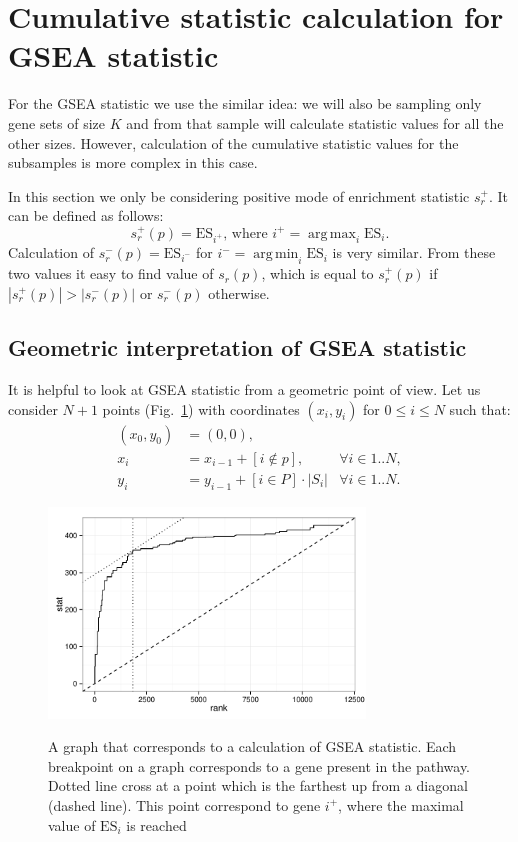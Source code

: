\documentclass[runningheads,a4paper]{llncs}
\DeclareMathOperator*{\argmax}{arg\,max}
\DeclareMathOperator*{\argmin}{arg\,min}
\begin{document}
\section{Cumulative statistic calculation for GSEA statistic}\label{section_gsea}

For the GSEA statistic we use the similar idea: we will also be sampling only 
gene sets of size $K$ and from that sample will calculate
statistic values for all the other sizes. However, calculation of the 
cumulative statistic values for the subsamples is more complex
in this case.

In this section we only be considering positive mode of 
enrichment statistic 
$s^+_{r}$. It can be defined as follows:
\[
s^+_r(p) = \mathrm{ES}_{i^+} \text{, where } i^+ =  \argmax_i \mathrm{ES}_i.
\]
Calculation of $s^-_{r}(p) = \mathrm{ES}_{i^-}$ 
for $i^- =  \argmin_i\mathrm{ES}_i$
is very similar. From these two values it easy to find 
value of $s_r(p)$, which is equal to $s^+_r(p)$ if
$|s^+_r(p)| > |s^-_r(p)|$ or $s^-_r(p)$ otherwise.


\subsection{Geometric interpretation of GSEA statistic}

It is helpful to look at GSEA statistic from a geometric point of view.
Let us consider $N+1$ points (Fig.~\ref{fig_gsea_stat}) with coordinates $(x_i, y_i)$ for $0 \le i \le N$
such that:
\begin{align}
    \label{eq_simple_0}
    (x_0, y_0) &= (0, 0), & \\ 
    \label{eq_simple_x}
    x_i &= x_{i-1} + [i \not \in p],       &\forall i \in 1..N, \\
    \label{eq_simple_y}
    y_i &= y_{i-1} + [i \in P] \cdot |S_i| &\forall i \in 1..N.
\end{align}

\begin{figure}[h]
    \centering
    { \includegraphics[width=0.75\textwidth]{gsea_stat.pdf} }
    \caption{A graph that corresponds to a calculation of GSEA 
    statistic. Each breakpoint on a graph corresponds to 
    a gene present in the pathway. 
    Dotted line cross at a point which is the farthest
up from a diagonal (dashed line). This point correspond to gene $i^+$, 
where the maximal value of $\mathrm{ES}_i$ is reached}%
    \label{fig_gsea_stat}%
\end{figure}
\end{document}
